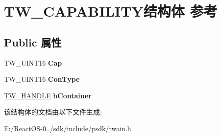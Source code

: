 \hypertarget{struct_t_w___c_a_p_a_b_i_l_i_t_y}{}\section{T\+W\+\_\+\+C\+A\+P\+A\+B\+I\+L\+I\+T\+Y结构体 参考}
\label{struct_t_w___c_a_p_a_b_i_l_i_t_y}
\subsection*{Public 属性}
\begin{DoxyCompactItemize}
\item 
\mbox{\label{struct_t_w___c_a_p_a_b_i_l_i_t_y_ad96bdbd550df1706d66b3846b05966ec}} 
T\+W\+\_\+\+U\+I\+N\+T16 {\bfseries Cap}
\item 
\mbox{\label{struct_t_w___c_a_p_a_b_i_l_i_t_y_ad4149487465b52ea6baf87ea6f209ed8}} 
T\+W\+\_\+\+U\+I\+N\+T16 {\bfseries Con\+Type}
\item 
\mbox{\label{struct_t_w___c_a_p_a_b_i_l_i_t_y_af4b1ecc049d93e1c9b8740be7044ebf8}} 
\hyperlink{interfacevoid}{T\+W\+\_\+\+H\+A\+N\+D\+LE} {\bfseries h\+Container}
\end{DoxyCompactItemize}


该结构体的文档由以下文件生成\+:\begin{DoxyCompactItemize}
\item 
E\+:/\+React\+O\+S-\/0../sdk/include/psdk/twain.\+h\end{DoxyCompactItemize}
